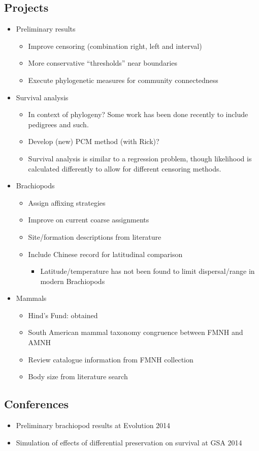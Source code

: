\documentclass[12pt,letterpaper]{article}
\begin{document}
\subsection{Projects}
\begin{itemize}
  \item Preliminary results
    \begin{itemize}
      \item Improve censoring (combination right, left and interval)
      \item More conservative ``thresholds'' near boundaries
      \item Execute phylogenetic measures for community connectedness
    \end{itemize}
  \item Survival analysis
    \begin{itemize}
      \item In context of phylogeny? Some work has been done recently to include pedigrees and such. 
      \item Develop (new) PCM method (with Rick)?
      \item Survival analysis is similar to a regression problem, though likelihood is calculated differently to allow for different censoring methods.
    \end{itemize}
  \item Brachiopods
    \begin{itemize}
      \item Assign affixing strategies
      \item Improve on current coarse assignments
      \item Site/formation descriptions from literature
      \item Include Chinese record for latitudinal comparison
        \begin{itemize}
          \item Latitude/temperature has not been found to limit dispersal/range in modern Brachiopods
        \end{itemize}
    \end{itemize}
  \item Mammals
    \begin{itemize}
      \item Hind's Fund: obtained
      \item South American mammal taxonomy congruence between FMNH and AMNH
      \item Review catalogue information from FMNH collection
      \item Body size from literature search
    \end{itemize}
\end{itemize}

\subsection{Conferences}
\begin{itemize}
  \item Preliminary brachiopod results at Evolution 2014
  \item Simulation of effects of differential preservation on survival at GSA 2014
\end{itemize}
\end{document}
